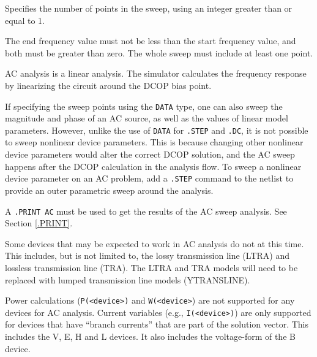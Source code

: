 \begin{Command}
\begin{Arguments}
\begin{description}
\end{description}

Specifies the number of points in the sweep, using an integer greater than or equal to 1.


The end frequency value must not be less than the start frequency value,
and both must be greater than zero. The whole sweep must include at
least one point.

\end{Arguments}

\comments

AC analysis is a linear analysis. The simulator calculates the frequency
response by linearizing the circuit around the DCOP bias point.

If specifying the sweep points using the \texttt{DATA} type, one can
also sweep the magnitude and phase of an AC source, as well as the
values of linear model parameters.  However, unlike the use of
\texttt{DATA} for \texttt{.STEP} and \texttt{.DC}, it is not possible
to sweep nonlinear device parameters.  This is because changing other
nonlinear device parameters would alter the correct DCOP solution, and
the AC sweep happens after the DCOP calculation in the analysis flow.
To sweep a nonlinear device parameter on an AC problem, add a
\texttt{.STEP} command to the netlist to provide an outer parametric
sweep around the analysis.

A \texttt{.PRINT AC} must be used to get the results of the AC sweep
analysis.  See Section \ref{.PRINT}.

Some devices that may be expected to work in AC analysis do not at
this time.  This includes, but is not limited to, the lossy
transmission line (LTRA) and lossless transmission line (TRA).  The
LTRA and TRA models will need to be replaced with lumped transmission
line models (YTRANSLINE).

Power calculations (\texttt{P(<device>)} and \texttt{W(<device>}) are
not supported for any devices for AC analysis.  Current variables
(e.g., \texttt{I(<device>)}) are only supported for devices that have
``branch currents'' that are part of the solution vector. This
includes the V, E, H and L devices.  It also includes the voltage-form
of the B device.

\end{Command}
